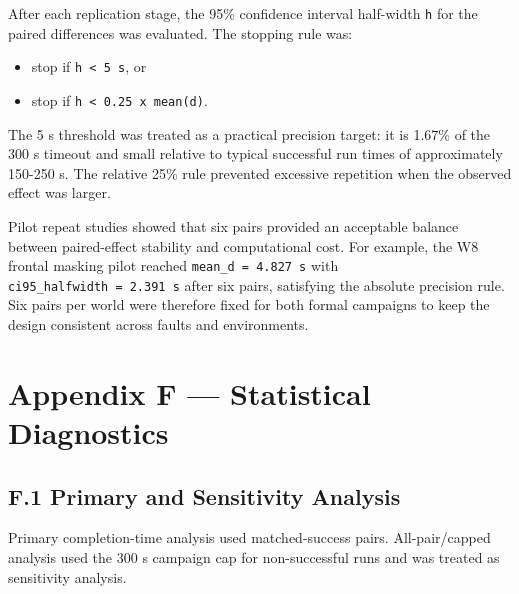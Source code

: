 After each replication stage, the 95\% confidence interval half-width \texttt{h} for the paired differences was evaluated. The stopping rule was:

\begin{itemize}
\tightlist
\item
  stop if \texttt{h\ \textless{}\ 5\ s}, or
\item
  stop if \texttt{h\ \textless{}\ 0.25\ x\ \textbar{}mean(d)\textbar{}}.
\end{itemize}

The 5 s threshold was treated as a practical precision target: it is 1.67\% of the 300 s timeout and small relative to typical successful run times of approximately 150-250 s. The relative 25\% rule prevented excessive repetition when the observed effect was larger.

Pilot repeat studies showed that six pairs provided an acceptable balance between paired-effect stability and computational cost. For example, the W8 frontal masking pilot reached \texttt{mean\_d\ =\ 4.827\ s} with \texttt{ci95\_halfwidth\ =\ 2.391\ s} after six pairs, satisfying the absolute precision rule. Six pairs per world were therefore fixed for both formal campaigns to keep the design consistent across faults and environments.

\hypertarget{appendix-f-statistical-diagnostics}{%
\section{Appendix F --- Statistical Diagnostics}\label{appendix-f-statistical-diagnostics}}

\hypertarget{f.1-primary-and-sensitivity-analysis}{%
\subsection{F.1 Primary and Sensitivity Analysis}\label{f.1-primary-and-sensitivity-analysis}}

Primary completion-time analysis used matched-success pairs. All-pair/capped analysis used the 300 s campaign cap for non-successful runs and was treated as sensitivity analysis.

